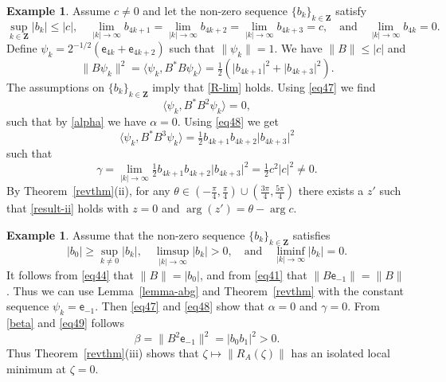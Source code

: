 \documentclass[12pt,a4paper]{article}
\numberwithin{equation}{section}
\theoremstyle{plain}
\theoremstyle{definition}
\newtheorem{example}[theorem]{Example}
\newcommand{\abs}[1]{\lvert{#1}\rvert}  %
\newcommand{\norm}[1]{\lVert{#1}\rVert} %
\newcommand{\ip}[2]{\langle{#1},{#2}\rangle} %
\newcommand{\bZ}{\mathbf{Z}}
\DeclareMathOperator{\Arg}{arg}
\newcommand{\be}[1]{\mathsf{e}_{#1}}
\begin{document}
\begin{example}\label{ex44}
	Assume $c\neq0$ and let the non-zero sequence $\{b_k\}_{k\in\bZ}$ satisfy
	\begin{equation*}
		\sup_{k\in\bZ}\abs{b_k}\leq\abs{c}, \quad \lim_{\abs{k}\to\infty}b_{4k+1}=\lim_{\abs{k}\to\infty}b_{4k+2} = \lim_{\abs{k}\to\infty}b_{4k+3} = c, \quad\text{and}\quad \lim_{\abs{k}\to\infty}b_{4k}=0.
	\end{equation*}
	Define $\psi_k=2^{-1/2}(\be{4k}+\be{4k+2})$ such that $\norm{\psi_k}=1$. We have $\norm{B}\leq\abs{c}$ and
	\begin{equation*}
		\norm{B\psi_k}^2=\ip{\psi_k}{B^{\ast}B\psi_k}=\tfrac{1}{2}(\abs{b_{4k+1}}^2 + \abs{b_{4k+3}}^2).
	\end{equation*}
	The assumptions on $\{b_k\}_{k\in\bZ}$ imply that \eqref{R-lim} holds. Using \eqref{eq47} we find
	\begin{equation*}
		\ip{\psi_k}{B^{\ast}B^2\psi_k}=0,
	\end{equation*}
	such that by \eqref{alpha} we have $\alpha=0$. Using \eqref{eq48} we get
	\begin{equation*}
		\ip{\psi_k}{B^{\ast}{B^3}\psi_k}=\tfrac{1}{2} b_{4k+1}b_{4k+2}\abs{b_{4k+3}}^2
	\end{equation*}
	such that 
	\begin{equation*}
		\gamma=\lim_{\abs{k}\to\infty}	\tfrac{1}{2} b_{4k+1}b_{4k+2}\abs{b_{4k+3}}^2 = \tfrac{1}{2}c^2\abs{c}^2\neq 0.
	\end{equation*}
	By Theorem~\ref{revthm}(ii), for any $\theta\in(-\tfrac{\pi}{4},\tfrac{\pi}{4})\cup(\tfrac{3\pi}{4},\tfrac{5\pi}{4})$ there exists a $z'$ such that \eqref{result-ii} holds with $z=0$ and $\Arg(z')=\theta-\Arg c$.
\end{example}

\begin{example}\label{ex41}
	Assume that the non-zero sequence $\{b_k\}_{k\in\bZ}$ satisfies
	\begin{equation*}
		\abs{b_0}\geq\sup_{k\neq0}\abs{b_k}, \quad \limsup_{\abs{k}\to\infty}\abs{b_k}>0, \quad\text{and}\quad \liminf_{\abs{k}\to\infty}\abs{b_k}=0.
	\end{equation*}
	It follows from \eqref{eq44} that $\norm{B}=\abs{b_0}$, and from \eqref{eq41} that $\norm{B\be{-1}}=\norm{B}$. Thus we can use Lemma~\ref{lemma-abg} and Theorem~\ref{revthm} with the constant sequence
	$\psi_k=\be{-1}$. Then \eqref{eq47} and \eqref{eq48} show that $\alpha=0$ and $\gamma=0$. From \eqref{beta} and \eqref{eq49} follows 
	\begin{equation*}
		\beta=\norm{B^2\be{-1}}^2=\abs{b_0b_1}^2>0.
	\end{equation*}
	Thus Theorem~\ref{revthm}(iii) shows that $\zeta\mapsto\norm{R_A(\zeta)}$ has an isolated local minimum at $\zeta=0$. 
\end{example}
\end{document}
